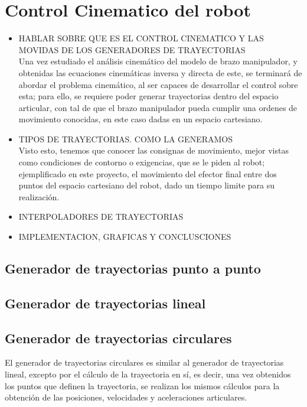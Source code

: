 \section{Control Cinematico del robot}
\begin{itemize}
	\item HABLAR SOBRE QUE ES EL CONTROL CINEMATICO Y LAS MOVIDAS DE LOS GENERADORES DE TRAYECTORIAS
\\Una vez estudiado el análisis cinemático del modelo de brazo manipulador, y obtenidas las ecuaciones cinemáticas inversa y directa de este, se terminará de abordar el problema cinemático, al ser capaces de desarrollar el control sobre esta; para ello, se requiere poder generar trayectorias dentro del espacio articular, con tal de que el brazo manipulador pueda cumplir una ordenes de movimiento conocidas, en este caso dadas en un espacio cartesiano.\\

\item TIPOS DE TRAYECTORIAS. COMO LA GENERAMOS
\\Visto esto, tenemos que conocer las consignas de movimiento, mejor vistas como condiciones de contorno o exigencias, que se le piden al robot; ejemplificado en este proyecto, el movimiento del efector final entre dos puntos del espacio cartesiano del robot, dado un tiempo limite para su realización.\\

	\item INTERPOLADORES DE TRAYECTORIAS
	\item IMPLEMENTACION, GRAFICAS Y CONCLUSCIONES 
\end{itemize}
	\subsection{Generador de trayectorias punto a punto}
	 
	\subsection{Generador de trayectorias lineal}
	
	\subsection{Generador de trayectorias circulares}
	El generador de trayectorias circulares es similar al generador de trayectorias lineal, excepto por el cálculo de la trayectoria en sí, es decir, una vez obtenidos los puntos que definen la trayectoria, se realizan los mismos cálculos para la obtención de las posiciones, velocidades y aceleraciones articulares.
	
